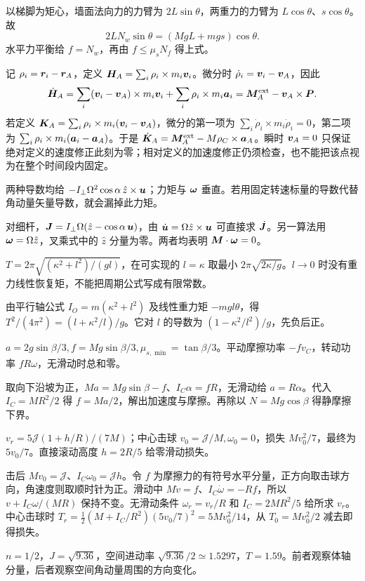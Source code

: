 \begin{bookexercises}
以梯脚为矩心，墙面法向力的力臂为 $2L\sin\theta$，两重力的力臂为 $L\cos\theta$、$s\cos\theta$。故
\[
2LN_w\sin\theta=(MgL+mgs)\cos\theta .
\]水平力平衡给 $f=N_w$，再由 $f\le\mu_s N_f$ 得上式。
\item 记 $\rho_i=\boldsymbol{r}_i-\boldsymbol{r}_A$，定义 $\boldsymbol H_A=\sum_i\rho_i\times m_i\boldsymbol{v}_i$。微分时 $\dot\rho_i=\boldsymbol{v}_i-\boldsymbol{v}_A$，因此
\[
\dot{\boldsymbol H}_A
=\sum_i(\boldsymbol{v}_i-\boldsymbol{v}_A)\times m_i\boldsymbol{v}_i+\sum_i\rho_i\times m_i\boldsymbol{a}_i
=\boldsymbol{M}_A^{\rm ext}-\boldsymbol{v}_A\times\boldsymbol{P} .
\]
若定义 $\boldsymbol K_A=\sum_i\rho_i\times m_i(\boldsymbol{v}_i-\boldsymbol{v}_A)$，微分的第一项为 $\sum_i\dot\rho_i\times m_i\dot\rho_i=0$，第二项为 $\sum_i\rho_i\times m_i(\boldsymbol{a}_i-\boldsymbol{a}_A)$。于是 $\dot{\boldsymbol K}_A=\boldsymbol{M}_A^{\rm ext}-M\rho_C\times\boldsymbol{a}_A$。瞬时 $\boldsymbol{v}_A=0$ 只保证绝对定义的速度修正此刻为零；相对定义的加速度修正仍须检查，也不能把该点视为在整个时间段内固定。
\item 两种导数均给 $-I_\perp\Omega^2\cos\alpha\,\hat z\times\boldsymbol{u}$；力矩与 $\boldsymbol{\omega}$ 垂直。若用固定转速标量的导数代替角动量矢量导数，就会漏掉此力矩。

对细杆，$\boldsymbol{J}=I_\perp\Omega(\hat z-\cos\alpha\,\boldsymbol{u})$，由 $\dot{\boldsymbol{u}}=\Omega\hat z\times\boldsymbol{u}$ 可直接求 $\dot{\boldsymbol{J}}$。另一算法用 $\boldsymbol{\omega}=\Omega\hat z$，叉乘式中的 $\hat z$ 分量为零。两者均表明 $\boldsymbol{M}\cdot\boldsymbol{\omega}=0$。
\item $T=2\pi\sqrt{(\kappa^2+l^2)/(gl)}$，在可实现的 $l=\kappa$ 取最小 $2\pi\sqrt{2\kappa/g}$。$l\to0$ 时没有重力线性恢复矩，不能把周期公式写成有限常数。

由平行轴公式 $I_O=m(\kappa^2+l^2)$ 及线性重力矩 $-mgl\theta$，得 $T^2/(4\pi^2)=(l+\kappa^2/l)/g$。它对 $l$ 的导数为 $(1-\kappa^2/l^2)/g$，先负后正。
\item $a=2g\sin\beta/3,f=Mg\sin\beta/3,\mu_{s,\min}=\tan\beta/3$。平动摩擦功率 $-fv_C$，转动功率 $fR\omega$，无滑动时总和零。

取向下沿坡为正，$Ma=Mg\sin\beta-f$、$I_C\alpha=fR$，无滑动给 $a=R\alpha$。代入 $I_C=MR^2/2$ 得 $f=Ma/2$，解出加速度与摩擦。再除以 $N=Mg\cos\beta$ 得静摩擦下界。
\item $v_r=5\mathcal J(1+h/R)/(7M)$；中心击球 $v_0=\mathcal J/M,\omega_0=0$，损失 $Mv_0^2/7$，最终为 $5v_0/7$。直接滚动高度 $h=2R/5$ 给零滑动损失。

击后 $Mv_0=\mathcal J$、$I_C\omega_0=\mathcal Jh$。令 $f$ 为摩擦力的有符号水平分量，正方向取击球方向，角速度则取顺时针为正。滑动中 $M\dot v=f$、$I_C\dot\omega=-Rf$，所以 $v+I_C\omega/(MR)$ 保持不变。无滑动条件 $\omega_r=v_r/R$ 和 $I_C=2MR^2/5$ 给所求 $v_r$。中心击球时 $T_r=\frac12(M+I_C/R^2)(5v_0/7)^2=5Mv_0^2/14$，从 $T_0=Mv_0^2/2$ 减去即得损失。
\item $n=1/2$，$J=\sqrt{9.36}$，空间进动率 $\sqrt{9.36}/2\simeq1.5297$，$T=1.59$。前者观察体轴分量，后者观察空间角动量周围的方向变化。


\end{bookexercises}

